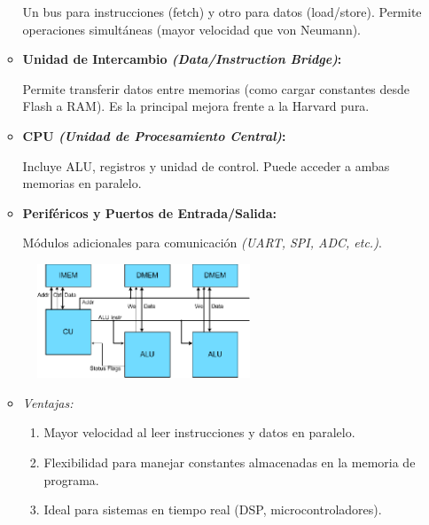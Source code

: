\documentclass[12pt,letterpaper]{article}
\begin{document}
\begin{enumerate}
\begin{itemize}
    Un bus para instrucciones (fetch) y otro para datos (load/store). Permite operaciones simultáneas (mayor velocidad que von Neumann).
    
  \item \textbf{Unidad de Intercambio \textit{(Data/Instruction Bridge)}:}

    Permite transferir datos entre memorias (como cargar constantes desde Flash a RAM). Es la principal mejora frente a la Harvard pura.
    
  \item \textbf{CPU \textit{(Unidad de Procesamiento Central)}:}
    
    Incluye ALU, registros y unidad de control. Puede acceder a ambas memorias en paralelo.
    
  \item \textbf{Periféricos y Puertos de Entrada/Salida:}
    
    Módulos adicionales para comunicación \textit{(UART, SPI, ADC, etc.)}.
    
  \end{itemize}
  
  \begin{figure}[H]
    \centering
    \includegraphics[width=0.6\textwidth]{image.png}
  \end{figure}

  \begin{itemize}
  \item \textit{Ventajas:}
    
    \begin{enumerate}[label=\arabic*)]
    \item Mayor velocidad al leer instrucciones y datos en paralelo.
      
    \item Flexibilidad para manejar constantes almacenadas en la memoria de programa.
      
    \item Ideal para sistemas en tiempo real (DSP, microcontroladores).
    \end{enumerate}
    

\end{itemize}
\end{enumerate}
\end{document}
